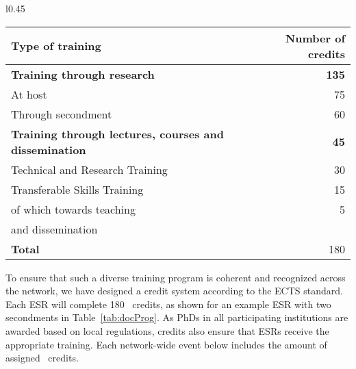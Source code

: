 \begin{wraptable}{l}{0.45\textwidth}
    \vspace{-2mm}
	\caption{Example \acronym\ doctoral program\label{tab:docProg}
	}\vspace{4mm}
	\small
	\begin{tabular}{p{50mm}r}
		\midrule
		Type of training & Number of credits \tabularnewline\midrule
		\textbf{Training through research}  & \textbf{135} \tabularnewline
		\hspace{5mm}At host & 75 \tabularnewline
		\hspace{5mm}Through secondment  & 60 \tabularnewline\midrule
		\textbf{Training through lectures, courses and dissemination} &  \textbf{45} \tabularnewline
		\hspace{5mm}Technical and Research Training & 30 \tabularnewline
		\hspace{5mm}Transferable Skills Training & 15 \tabularnewline
		\hspace{10mm}of which towards teaching & 5\tabularnewline
        \hspace{10mm}and dissemination & \tabularnewline
		\textbf{Total} &  180 \tabularnewline
		\bottomrule
	\end{tabular}
    \vspace{-2mm}
\end{wraptable}

To ensure that such a diverse training program is coherent and recognized across the network, we have designed  a \acronym credit system according to the ECTS standard. 
Each ESR will complete 180 \acronym\ credits, as shown for an example ESR with two secondments in Table~\ref{tab:docProg}.
As PhDs in all participating institutions are awarded based on local regulations, \acronym credits also ensure that ESRs receive the appropriate training. 
Each network-wide event below includes the amount of assigned \acronym\ credits.

